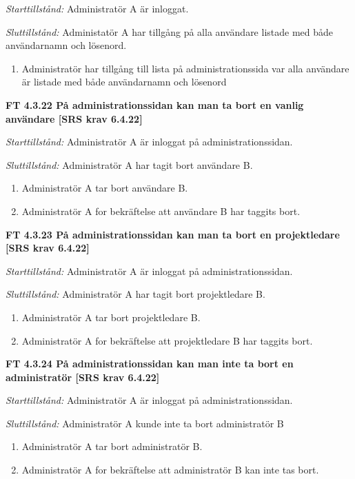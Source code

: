 \documentclass[a4paper]{article}
\begin{document}
\emph{Starttillstånd:} Administratör A är inloggat.

\emph{Sluttillstånd:} Administatör A har tillgång på alla användare listade med både användarnamn och lösenord.

\begin{enumerate}
\item Administratör har tillgång till lista på administrationssida var alla användare är listade med både användarnamn och lösenord
\end{enumerate}

\textbf{FT 4.3.22 På administrationssidan kan man ta bort en vanlig användare [SRS krav 6.4.22]}

\emph{Starttillstånd:} Administratör A är inloggat på administrationssidan.

\emph{Sluttillstånd:} Administratör A har tagit bort  användare B.

\begin{enumerate}
\item Administratör A tar bort  användare B.
\item Administratör A for bekräftelse att  användare B har taggits  bort. 
\end{enumerate}

\textbf{FT 4.3.23 På administrationssidan kan man ta bort en projektledare [SRS krav 6.4.22]}

\emph{Starttillstånd:} Administratör A är inloggat på administrationssidan.

\emph{Sluttillstånd:} Administratör A har tagit bort  projektledare B.

\begin{enumerate}
\item Administratör A tar bort  projektledare B.
\item Administratör A for bekräftelse att  projektledare B har taggits bort. 
\end{enumerate}

\textbf{FT 4.3.24 På administrationssidan kan man inte ta bort en administratör [SRS krav 6.4.22]}

\emph{Starttillstånd:} Administratör A är inloggat på administrationssidan.

\emph{Sluttillstånd:} Administratör A kunde inte ta bort  administratör B

\begin{enumerate}
\item Administratör A tar bort  administratör B.
\item Administratör A for bekräftelse att administratör B kan inte tas bort. 
\end{enumerate}
\end{document}
